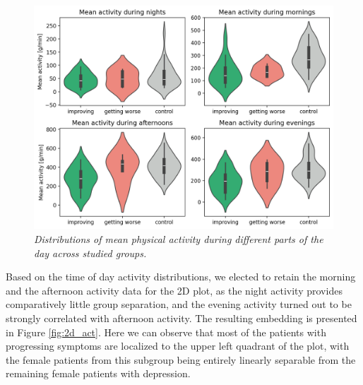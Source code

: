 \documentclass[12pt]{article}
\begin{document}
\begin{figure}[!t]
    \centering
    \includegraphics[width=.9\textwidth]{images/act_pod.png}
    \captionsetup{justification=centering}
    \caption{\textit{Distributions of mean physical activity during different parts of the day across studied groups.}}
    \label{fig:act_pod}
\end{figure}



Based on the time of day activity distributions, we elected to retain the morning and the afternoon activity data for the 2D plot, as the night activity provides comparatively little group separation, and the evening activity turned out to be strongly correlated with afternoon activity. The resulting embedding is presented in Figure \ref{fig:2d_act}. Here we can observe that most of the patients with progressing symptoms are localized to the upper left quadrant of the plot, with the female patients from this subgroup being entirely linearly separable from the remaining female patients with depression.
\end{document}
